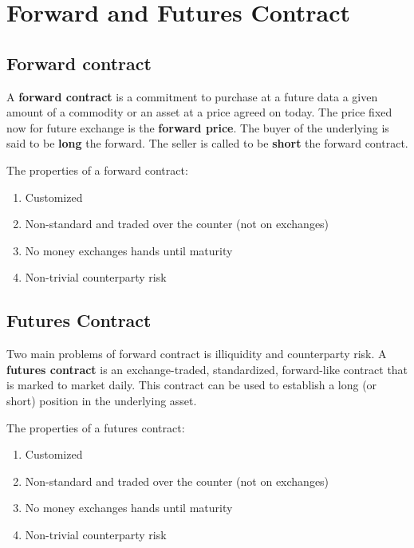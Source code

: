 \chapter{Forward and Futures Contract}

\section{Forward contract}
A \textbf{forward contract} is a commitment to purchase at a future data a given amount of a commodity or an asset at a price agreed on today. The price fixed now for future exchange is the \textbf{forward price}. The buyer of the underlying is said to be \textbf{long} the forward. The seller is called to be \textbf{short} the forward contract.

The properties of a forward contract:
\begin{enumerate}
    \item Customized 
    \item Non-standard and traded over the counter (not on exchanges)
    \item No money exchanges hands until maturity
    \item Non-trivial counterparty risk
\end{enumerate}

\section{Futures Contract}
Two main problems of forward contract is illiquidity and counterparty risk. A \textbf{futures contract} is an exchange-traded, standardized, forward-like contract that is marked to market daily. This contract can be used to establish a long (or short) position in the underlying asset.

The properties of a futures contract:
\begin{enumerate}
    \item Customized 
    \item Non-standard and traded over the counter (not on exchanges)
    \item No money exchanges hands until maturity
    \item Non-trivial counterparty risk
\end{enumerate}